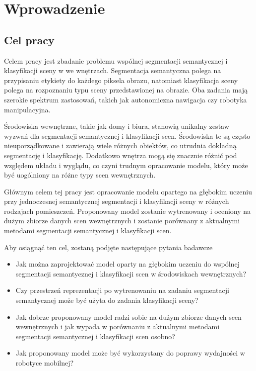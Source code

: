 \newpage %
\section{Wprowadzenie}

\subsection{Cel pracy}
Celem pracy jest zbadanie problemu wspólnej segmentacji semantycznej i klasyfikacji sceny w we wnętrzach. Segmentacja semantyczna polega na przypisaniu etykiety do każdego piksela obrazu, natomiast klasyfikacja sceny polega na rozpoznaniu typu sceny przedstawionej na obrazie. Oba zadania mają szerokie spektrum zastosowań, takich jak autonomiczna nawigacja czy robotyka manipulacyjna.

Środowiska wewnętrzne, takie jak domy i biura, stanowią unikalny zestaw wyzwań dla segmentacji semantycznej i klasyfikacji scen. Środowiska te są często nieuporządkowane i zawierają wiele różnych obiektów, co utrudnia dokładną segmentację i klasyfikację. Dodatkowo wnętrza mogą się znacznie różnić pod względem układu i wyglądu, co czyni trudnym opracowanie modelu, który może być uogólniony na różne typy scen wewnętrznych.

Głównym celem tej pracy jest opracowanie modelu opartego na głębokim uczeniu przy jednoczesnej semantycznej segmentacji i klasyfikacji sceny w różnych rodzajach pomieszczeń. Proponowany model zostanie wytrenowany i oceniony na dużym zbiorze danych scen wewnętrznych i zostanie porównany z aktualnymi metodami segmentacji semantycznej i klasyfikacji scen.

Aby osiągnąć ten cel, zostaną podjęte następujące pytania badawcze
\begin{itemize}
    \item Jak można zaprojektować model oparty na głębokim uczeniu do wspólnej segmentacji semantycznej i klasyfikacji scen w środowiskach wewnętrznych?
    \item Czy przestrzeń reprezentacji po wytrenowaniu na zadaniu segmentacji semantycznej może być użyta do zadania klasyfikacji sceny?
    \item Jak dobrze proponowany model radzi sobie na dużym zbiorze danych scen wewnętrznych i jak wypada w porównaniu z aktualnymi metodami segmentacji semantycznej i klasyfikacji scen osobno?
    \item Jak proponowany model może być wykorzystany do poprawy wydajności w robotyce mobilnej?
\end{itemize}

